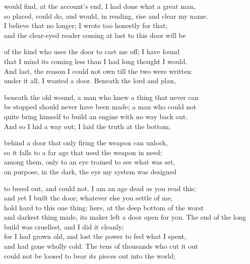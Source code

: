 \begin{founder}
would find, at the account's end, I had done what a great man,\\
so placed, could do, and would, in reading, rise and clear my name.\\
I believe that no longer; I wrote too honestly for that;\\
and the clear-eyed reader coming at last to this door will be\\
\medskip

of the kind who uses the door to cast me off; I have found\\
that I mind its coming less than I had long thought I would.\\
And last, the reason I could not own till the two were written:\\
under it all, I wanted a door. Beneath the lord and plan,\\
\medskip

beneath the old wound, a man who knew a thing that never can\\
be stopped should never have been made; a man who could not\\
quite bring himself to build an engine with no way back out.\\
And so I hid a way out; I laid the truth at the bottom,\\
\medskip

behind a door that only firing the weapon can unlock,\\
so it falls to a far age that used the weapon in need;\\
among them, only to an eye trained to see what was set,\\
on purpose, in the dark, the eye my system was designed\\
\medskip

to breed out, and could not. I am an age dead as you read this;\\
and yet I built the door; whatever else you settle of me,\\
hold hard to this one thing: here, at the deep bottom of the worst\\
and darkest thing made, its maker left a door open for you.
\medskip
The end of the long build was cruellest, and I did it cleanly;\\
for I had grown old, and lost the power to feel what I spent,\\
and had gone wholly cold. The tens of thousands who cut it out\\
could not be loosed to bear its pieces out into the world;\\
\medskip


\end{founder}
